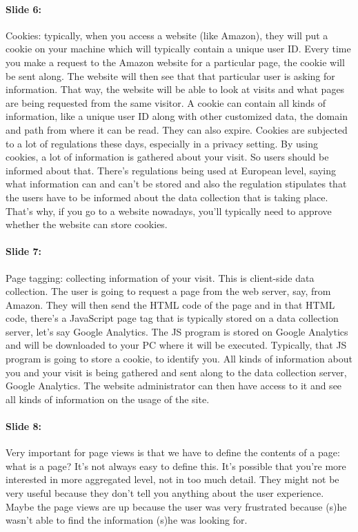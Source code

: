 \documentclass[10pt,a4paper]{report}
\begin{document}
\paragraph{Slide 6:}Cookies: typically, when you access a website (like Amazon), they will put a cookie on your machine which will typically contain a unique user ID. Every time you make a request to the Amazon website for a particular page, the cookie will be sent along. The website will then see that that particular user is asking for information. That way, the website will be able to look at visits and what pages are being requested from the same visitor. A cookie can contain all kinds of information, like a unique user ID along with other customized data, the domain and path from where it can be read. They can also expire.
Cookies are subjected to a lot of regulations these days, especially in a privacy setting. By using cookies, a lot of information is gathered about your visit. So users should be informed about that. There's regulations being used at European level, saying what information can and can't be stored and also the regulation stipulates that the users have to be informed about the data collection that is taking place. That's why, if you go to a website nowadays, you'll typically need to approve whether the website can store cookies.

\paragraph{Slide 7:}Page tagging: collecting information of your visit. This is client-side data collection. The user is going to request a page from the web server, say, from Amazon. They will then send the HTML code of the page and in that HTML code, there's a JavaScript page tag that is typically stored on a data collection server, let's say Google Analytics. The JS program is stored on Google Analytics and will be downloaded to your PC where it will be executed. Typically, that JS program is going to store a cookie, to identify you. All kinds of information about you and your visit is being gathered and sent along to the data collection server, Google Analytics. The website administrator can then have access to it and see all kinds of information on the usage of the site.

\paragraph{Slide 8:}Very important for page views is that we have to define the contents of a page: what is a page? It's not always easy to define this. It's possible that you're more interested in more aggregated level, not in too much detail. They might not be very useful because they don't tell you anything about the user experience. Maybe the page views are up because the user was very frustrated because (s)he wasn't able to find the information (s)he was looking for.
\end{document}
